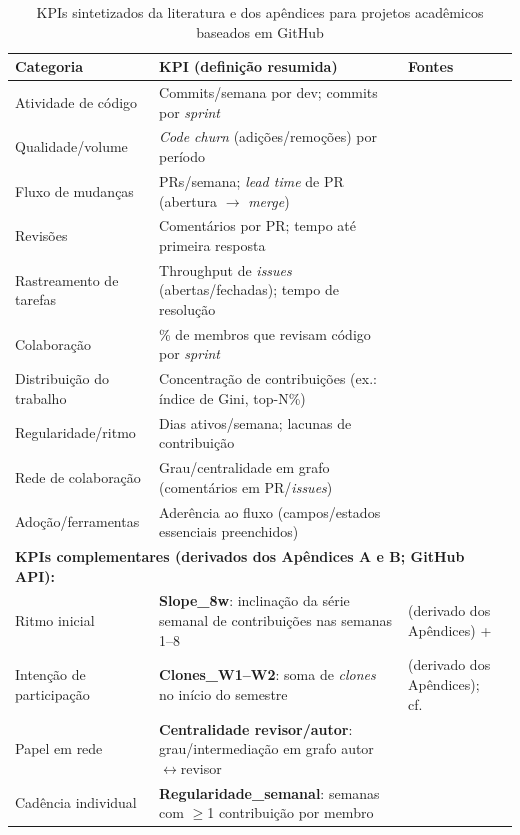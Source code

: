 \documentclass[
	12pt,
	openright,
	oneside,
	a4paper,
	brazil
]{abntex2}
\begin{document}
\begin{table}[htbp]
\centering
\caption{KPIs sintetizados da literatura e dos apêndices para projetos acadêmicos baseados em GitHub}
\label{tab:kpis-literatura}
\renewcommand{\arraystretch}{1.2}
\setlength{\tabcolsep}{4pt}
\footnotesize
\begin{tabular}{p{3.6cm} p{7.6cm} p{3.0cm}}
\hline
\textbf{Categoria} & \textbf{KPI (definição resumida)} & \textbf{Fontes} \\
\hline
Atividade de código & Commits/semana por dev; commits por \textit{sprint} & \cite{hamer2021using} \\
Qualidade/volume & \textit{Code churn} (adições/remoções) por período & \cite{hamer2021using} \\
Fluxo de mudanças & PRs/semana; \textit{lead time} de PR (abertura $\rightarrow$ \textit{merge}) & \cite{hamer2021using,ozkan2019agile} \\
Revisões & Comentários por PR; tempo até primeira resposta & \cite{ozkan2019agile,temitope2020software} \\
Rastreamento de tarefas & Throughput de \textit{issues} (abertas/fechadas); tempo de resolução & \cite{barbosaIndicadoresConjunto2016} \\
Colaboração & \% de membros que revisam código por \textit{sprint} & \cite{ozkan2019agile,temitope2020software} \\
Distribuição do trabalho & Concentração de contribuições (ex.: índice de Gini, top-N\%) & \cite{hamer2021using} \\
Regularidade/ritmo & Dias ativos/semana; lacunas de contribuição & \cite{kitchenham2010s,hamer2021using} \\
Rede de colaboração & Grau/centralidade em grafo (comentários em PR/\textit{issues}) & \cite{hamer2021using} \\
Adoção/ferramentas & Aderência ao fluxo (campos/estados essenciais preenchidos) & \cite{ozkan2019agile,temitope2020software} \\
\hline
\multicolumn{3}{l}{\textbf{KPIs complementares (derivados dos Apêndices A e B; GitHub API):}}\\
\hline
Ritmo inicial & \textbf{Slope\_8w}: inclinação da série semanal de contribuições nas semanas 1--8 & (derivado dos Apêndices) + \cite{kitchenham2010s,hamer2021using} \\
Intenção de participação & \textbf{Clones\_W1--W2}: soma de \textit{clones} no início do semestre & (derivado dos Apêndices); cf.\ \cite{barbosaGeracaoGitHub,oliveira2022plataforma} \\
Papel em rede & \textbf{Centralidade revisor/autor}: grau/intermediação em grafo autor$\leftrightarrow$revisor & \cite{hamer2021using} \\
Cadência individual & \textbf{Regularidade\_semanal}: semanas com $\geq$1 contribuição por membro & \cite{kitchenham2010s,hamer2021using} \\
\hline
\end{tabular}
\end{table}
\end{document}
